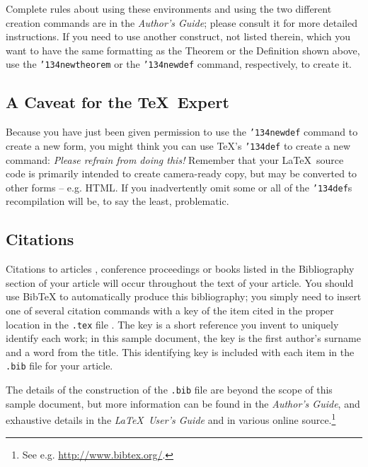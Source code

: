 \documentclass[sigconf]{nimepaper}
\begin{document}
Complete rules about using these environments and using the
two different creation commands are in the
\textit{Author's Guide}; please consult it for more
detailed instructions.  If you need to use another construct,
not listed therein, which you want to have the same
formatting as the Theorem
or the Definition \cite{salas:calculus} shown above,
use the \texttt{{\char'134}newtheorem} or the
\texttt{{\char'134}newdef} command,
respectively, to create it.

\subsection{A Caveat for the \TeX\ Expert}
Because you have just been given permission to
use the \texttt{{\char'134}newdef} command to create a
new form, you might think you can
use \TeX's \texttt{{\char'134}def} to create a
new command: \textit{Please refrain from doing this!}
Remember that your \LaTeX\ source code is primarily intended
to create camera-ready copy, but may be converted
to other forms -- e.g. HTML. If you inadvertently omit
some or all of the \texttt{{\char'134}def}s recompilation will
be, to say the least, problematic.



\subsection{Citations}
Citations to articles \cite{bowman:reasoning,
clark:pct, braams:babel, herlihy:methodology},
conference proceedings \cite{clark:pct} or
books \cite{salas:calculus, Lamport:LaTeX} listed
in the Bibliography section of your
article will occur throughout the text of your article.
You should use BibTeX to automatically produce this bibliography;
you simply need to insert one of several citation commands with
a key of the item cited in the proper location in
the \texttt{.tex} file \cite{Lamport:LaTeX}.
The key is a short reference you invent to uniquely
identify each work; in this sample document, the key is
the first author's surname and a
word from the title.  This identifying key is included
with each item in the \texttt{.bib} file for your article.

The details of the construction of the \texttt{.bib} file
are beyond the scope of this sample document, but more
information can be found in the \textit{Author's Guide},
and exhaustive details in the \textit{\LaTeX\ User's
Guide} \cite{Lamport:LaTeX} and in various online source.\footnote{See e.g. \url{http://www.bibtex.org/}.}
\end{document}
